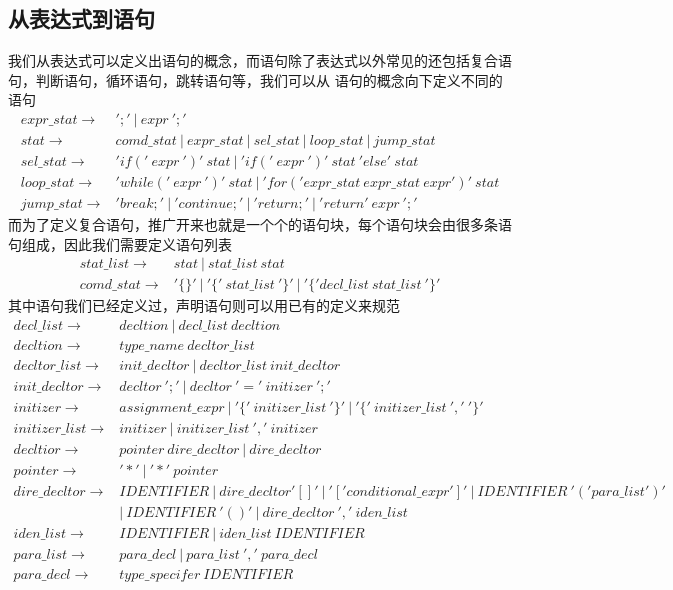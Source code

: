 \documentclass[UTF8]{ctexart}
\begin{document}
\subsection{从表达式到语句}
我们从表达式可以定义出语句的概念，而语句除了表达式以外常见的还包括复合语句，判断语句，循环语句，跳转语句等，我们可以从
语句的概念向下定义不同的语句
\begin{align*}
    expr\_stat\to & ';'\ |\ expr\ ';'\ \\
    stat\to & comd\_stat\ |\ expr\_stat\ |\ sel\_stat\ |\ loop\_stat\ |\ jump\_stat\\
    sel\_stat\to & 'if('\ expr\ ')'\ stat\ |\ 'if('\ expr\ ')'\ stat\ 'else'\ stat\\
    loop\_stat\to & 'while('\ expr\ ')'\ stat\ |\ 'for('expr\_stat\ expr\_stat\ expr')'\ stat\\
    jump\_stat\to & 'break;'\ |\ 'continue;'\ |\ 'return;'\ |\ 'return'\ expr\ ';'
\end{align*}
而为了定义复合语句，推广开来也就是一个个的语句块，每个语句块会由很多条语句组成，因此我们需要定义语句列表
\begin{align*}
    stat\_list\to & stat\ |\ stat\_list\ stat\\
    comd\_stat\to & '\{\}'\ |\ '\{'\ stat\_list\ '\}'\ |\ '\{'decl\_list\ stat\_list\ '\}'
\end{align*}
其中语句我们已经定义过，声明语句则可以用已有的定义来规范
\begin{align*}
    decl\_list\to & decltion\ |\ decl\_list\ decltion\\
    decltion\to & type\_name\ decltor\_list\\
    decltor\_list\to & init\_decltor\ |\ decltor\_list\ init\_decltor\\
    init\_decltor\to & decltor\ ';'\ |\ decltor\ '='\ initizer\ ';'\\
    initizer\to & assignment\_expr\ |\ '\{'\ initizer\_list\ '\}'\ |\ '\{'\ initizer\_list\ ','\ '\}'\\
    initizer\_list\to & initizer\ |\ initizer\_list\ ','\ initizer\\
    decltior\to & pointer\ dire\_decltor\ |\ dire\_decltor\\
    pointer\to & '*'\ |\ '*'\ pointer\\
    dire\_decltor\to & IDENTIFIER\ |\ dire\_decltor'[]'\ |\ '['conditional\_expr']'\ |\ IDENTIFIER\ '('para\_list')'\\
    & |\ IDENTIFIER\ '()'\ |\ dire\_decltor\ ','\ iden\_list\\
    iden\_list\to & IDENTIFIER\ |\ iden\_list\ IDENTIFIER\\
    para\_list\to & para\_decl\ |\ para\_list\ ','\ para\_decl\\
    para\_decl\to & type\_specifer\ IDENTIFIER
\end{align*}
\end{document}
